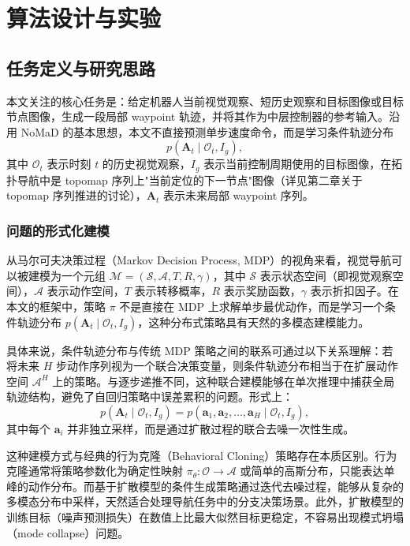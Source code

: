 
\chapter{算法设计与实验}

\section{任务定义与研究思路}

本文关注的核心任务是：给定机器人当前视觉观察、短历史观察和目标图像或目标节点图像，生成一段局部 waypoint 轨迹，并将其作为中层控制器的参考输入。沿用 NoMaD 的基本思想\cite{nomad2023}，本文不直接预测单步速度命令，而是学习条件轨迹分布
\begin{equation}
p(\mathbf{A}_t \mid \mathcal{O}_t, I_g),
\end{equation}
其中 $\mathcal{O}_t$ 表示时刻 $t$ 的历史视觉观察，$I_g$ 表示当前控制周期使用的目标图像，在拓扑导航中是 topomap 序列上"当前定位的下一节点"图像（详见第二章关于 topomap 序列推进的讨论），$\mathbf{A}_t$ 表示未来局部 waypoint 序列。

\subsection{问题的形式化建模}

从马尔可夫决策过程（Markov Decision Process, MDP）的视角来看，视觉导航可以被建模为一个元组 $\mathcal{M} = (\mathcal{S}, \mathcal{A}, T, R, \gamma)$，其中 $\mathcal{S}$ 表示状态空间（即视觉观察空间），$\mathcal{A}$ 表示动作空间，$T$ 表示转移概率，$R$ 表示奖励函数，$\gamma$ 表示折扣因子。在本文的框架中，策略 $\pi$ 不是直接在 MDP 上求解单步最优动作，而是学习一个条件轨迹分布 $p(\mathbf{A}_t \mid \mathcal{O}_t, I_g)$，这种分布式策略具有天然的多模态建模能力。

具体来说，条件轨迹分布与传统 MDP 策略之间的联系可通过以下关系理解：若将未来 $H$ 步动作序列视为一个联合决策变量，则条件轨迹分布相当于在扩展动作空间 $\mathcal{A}^H$ 上的策略。与逐步递推不同，这种联合建模能够在单次推理中捕获全局轨迹结构，避免了自回归策略中误差累积的问题。形式上：
\begin{equation}
p(\mathbf{A}_t \mid \mathcal{O}_t, I_g) = p(\mathbf{a}_1, \mathbf{a}_2, \ldots, \mathbf{a}_H \mid \mathcal{O}_t, I_g),
\end{equation}
其中每个 $\mathbf{a}_i$ 并非独立采样，而是通过扩散过程的联合去噪一次性生成。

这种建模方式与经典的行为克隆（Behavioral Cloning）策略存在本质区别。行为克隆通常将策略参数化为确定性映射 $\pi_\theta: \mathcal{O} \to \mathcal{A}$ 或简单的高斯分布，只能表达单峰的动作分布。而基于扩散模型的条件生成策略通过迭代去噪过程，能够从复杂的多模态分布中采样，天然适合处理导航任务中的分支决策场景。此外，扩散模型的训练目标（噪声预测损失）在数值上比最大似然目标更稳定，不容易出现模式坍塌（mode collapse）问题。

